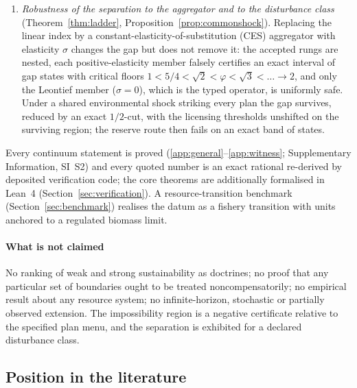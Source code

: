 \documentclass[preprint,11pt,authoryear]{elsarticle}
\theoremstyle{definition}
\theoremstyle{remark}
\begin{document}
\begin{enumerate}[leftmargin=2em,label=(\roman*)]
\item \emph{Robustness of the separation to the aggregator and to the disturbance class} (Theorem~\ref{thm:ladder}, Proposition~\ref{prop:commonshock}). Replacing the linear index by a constant-elasticity-of-substitution (CES) aggregator with elasticity $\sigma$ changes the gap but does not remove it: the accepted rungs are nested, each positive-elasticity member falsely certifies an exact interval of gap states with critical floors $1<5/4<\sqrt2<\varphi<\sqrt3<\dots\to2$, and only the Leontief member ($\sigma=0$), which is the typed operator, is uniformly safe. Under a shared environmental shock striking every plan the gap survives, reduced by an exact $1/2$-cut, with the licensing thresholds unshifted on the surviving region; the reserve route then fails on an exact band of states.
\end{enumerate}
Every continuum statement is proved (\ref{app:general}--\ref{app:witness}; Supplementary Information, SI~S2) and every quoted number is an exact rational re-derived by deposited verification code; the core theorems are additionally formalised in Lean~4 (Section~\ref{sec:verification}). A resource-transition benchmark (Section~\ref{sec:benchmark}) realises the datum as a fishery transition with units anchored to a regulated biomass limit.

\paragraph{What is not claimed} No ranking of weak and strong sustainability as doctrines; no proof that any particular set of boundaries ought to be treated noncompensatorily; no empirical result about any resource system; no infinite-horizon, stochastic or partially observed extension. The impossibility region is a negative certificate relative to the specified plan menu, and the separation is exhibited for a declared disturbance class.

\subsection{Position in the literature}
\end{document}
